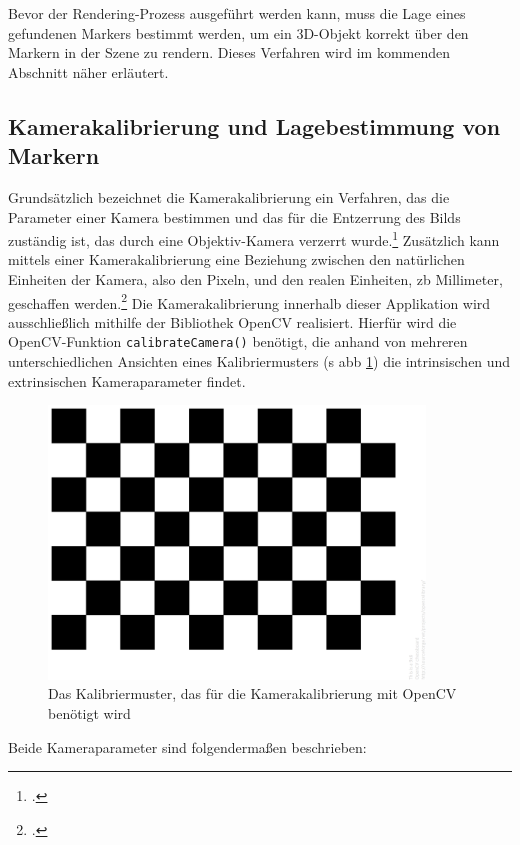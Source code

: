 \noindent Bevor der Rendering-Prozess ausgeführt werden kann, muss die Lage eines gefundenen Markers bestimmt werden, um ein 3D-Objekt korrekt über den Markern in der Szene zu rendern. Dieses Verfahren wird im kommenden Abschnitt näher erläutert.

\subsection{Kamerakalibrierung und Lagebestimmung von Markern}
Grundsätzlich bezeichnet die Kamerakalibrierung ein Verfahren, das die Parameter einer Kamera bestimmen und das für die Entzerrung des Bilds zuständig ist, das durch eine Objektiv-Kamera verzerrt wurde.\footcite{Hofmann2017} Zusätzlich kann mittels einer Kamerakalibrierung eine Beziehung zwischen den natürlichen Einheiten der Kamera, also den Pixeln, und den realen Einheiten, \acs{zb} Millimeter, geschaffen werden.\footcite{opencvCameraCalibration} Die Kamerakalibrierung innerhalb dieser Applikation wird ausschließlich mithilfe der Bibliothek OpenCV realisiert. Hierfür wird die OpenCV-Funktion \texttt{calibrateCamera()} benötigt, die anhand von mehreren unterschiedlichen Ansichten eines Kalibriermusters (\acs{s} \acs{abb} \ref{fig:ChessboardPattern}) die intrinsischen und extrinsischen Kameraparameter findet.

\begin{figure}[H]
\centering
\includegraphics[width=10cm]{Bilder/Implementierung/pattern.png}
\caption[Das Kalibriermuster, das für die Kamerakalibrierung mit OpenCV benötigt wird]{Das Kalibriermuster, das für die Kamerakalibrierung mit OpenCV benötigt wird\protect\footnotemark}
\label{fig:ChessboardPattern}
\end{figure}

\noindent Beide Kameraparameter sind folgendermaßen beschrieben:

